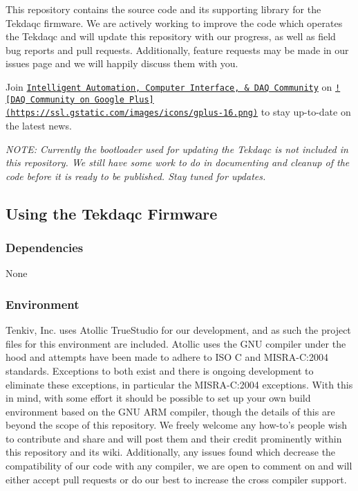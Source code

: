 This repository contains the source code and its supporting library for the Tekdaqc firmware. We are actively working to improve the code which operates the Tekdaqc and will update this repository with our progress, as well as field bug reports and pull requests. Additionally, feature requests may be made in our issues page and we will happily discuss them with you.

Join \href{https://plus.google.com/u/0/communities/109351353187504550254}{\tt Intelligent Automation, Computer Interface, \& D\-A\-Q Community} on \href{https://plus.google.com/u/0/communities/109351353187504550254}{\tt !\mbox{[}D\-A\-Q Community on Google Plus\mbox{]}(https\-://ssl.\-gstatic.\-com/images/icons/gplus-\/16.\-png)} to stay up-\/to-\/date on the latest news.

{\itshape N\-O\-T\-E\-: Currently the bootloader used for updating the Tekdaqc is not included in this repository. We still have some work to do in documenting and cleanup of the code before it is ready to be published. Stay tuned for updates.}

\subsection*{Using the Tekdaqc Firmware}

\subsubsection*{Dependencies}


\begin{DoxyEnumerate}
\item None
\end{DoxyEnumerate}

\subsubsection*{Environment}

Tenkiv, Inc. uses Atollic True\-Studio for our development, and as such the project files for this environment are included. Atollic uses the G\-N\-U compiler under the hood and attempts have been made to adhere to I\-S\-O C and M\-I\-S\-R\-A-\/\-C\-:2004 standards. Exceptions to both exist and there is ongoing development to eliminate these exceptions, in particular the M\-I\-S\-R\-A-\/\-C\-:2004 exceptions. With this in mind, with some effort it should be possible to set up your own build environment based on the G\-N\-U A\-R\-M compiler, though the details of this are beyond the scope of this repository. We freely welcome any how-\/to's people wish to contribute and share and will post them and their credit prominently within this repository and its wiki. Additionally, any issues found which decrease the compatibility of our code with any compiler, we are open to comment on and will either accept pull requests or do our best to increase the cross compiler support.

